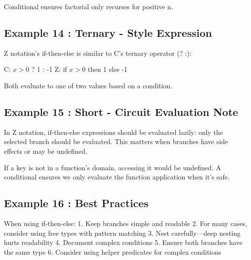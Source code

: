 \documentclass[a4paper,10pt,fleqn]{article}
\begin{document}
\noindent Conditional ensures factorial only recurses for positive n.

\bigskip

\subsection*{Example 14 : Ternary - Style Expression}

\noindent Z notation's if-then-else is similar to C's ternary operator (? :):

\bigskip

\noindent C: $x > 0$ ? 1 : -1 Z: if $x > 0$ then 1 else -1

\bigskip

\noindent Both evaluate to one of two values based on a condition.

\bigskip

\subsection*{Example 15 : Short - Circuit Evaluation Note}

\noindent In Z notation, if-then-else expressions should be evaluated lazily: only the selected branch should be evaluated. This matters when branches have side effects or may be undefined.

\bigskip

\noindent If a key is not in a function's domain, accessing it would be undefined. A conditional ensures we only evaluate the function application when it's safe.

\bigskip

\subsection*{Example 16 : Best Practices}

\noindent When using if-then-else: 1. Keep branches simple and readable 2. For many cases, consider using free types with pattern matching 3. Nest carefully—deep nesting hurts readability 4. Document complex conditions 5. Ensure both branches have the same type 6. Consider using helper predicates for complex conditions

\bigskip
\end{document}
